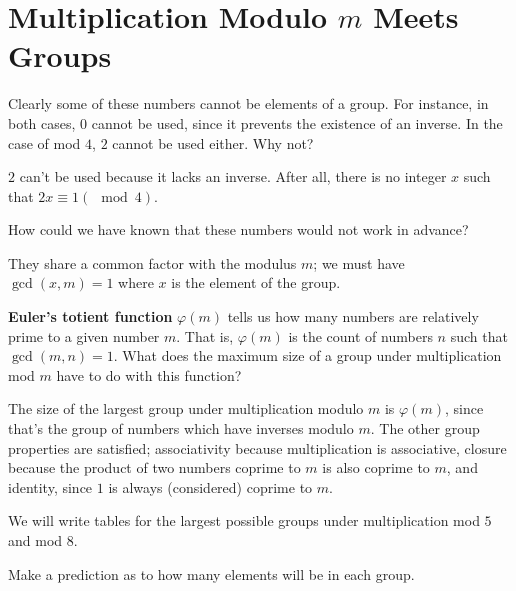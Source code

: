\documentclass[../gatm_answers.tex]{subfiles}
\begin{document}
\section{Multiplication Modulo $m$ Meets Groups}

\begin{outer_problem}[start=1]
\item Clearly some of these numbers cannot be elements of a group. For instance, in both cases, $0$ cannot be used, since it prevents the existence of an inverse. In the case of mod $4$, $2$ cannot be used either. Why not?
\end{outer_problem}

$2$ can't be used because it lacks an inverse. After all, there is no integer $x$ such that $2x\equiv 1 (\mod 4)$.

\begin{outer_problem}
\item How could we have known that these numbers would not work in advance?
\end{outer_problem}

They share a common factor with the modulus $m$; we must have $\gcd(x,m)=1$ where $x$ is the element of the group.

\begin{outer_problem}
\item \textbf{Euler's totient function} $\varphi(m)$ tells us how many numbers are relatively prime to a given number $m$. That is, $\varphi(m)$ is the count of numbers $n$ such that $\gcd(m,n)=1$. What does the maximum size of a group under multiplication mod $m$ have to do with this function?
\end{outer_problem}

The size of the largest group under multiplication modulo $m$ is $\varphi(m)$, since that's the group of numbers which have inverses modulo $m$. The other group properties are satisfied; associativity because multiplication is associative, closure because the product of two numbers coprime to $m$ is also coprime to $m$, and identity, since $1$ is always (considered) coprime to $m$.

\begin{outer_problem}
\item We will write tables for the largest possible groups under multiplication mod $5$ and mod $8$.
\end{outer_problem}

\begin{inner_problem}[start=1]
\item Make a prediction as to how many elements will be in each group.
\end{inner_problem}
\end{document}
